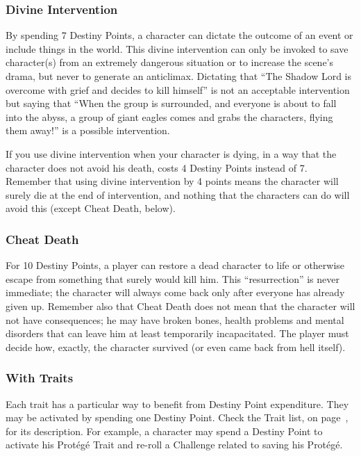 \begin{multicols}{2}
\subsubsection{Divine Intervention}
By spending 7 Destiny Points, a character can dictate the outcome of an event or include things in the world. This divine intervention can only be invoked to save character(s) from an extremely dangerous situation or to increase the scene’s drama, but never to generate an anticlimax. Dictating that ``The Shadow Lord is overcome with grief and decides to kill himself'' is not an acceptable intervention but saying that ``When the group is surrounded, and everyone is about to fall into the abyss, a group of giant eagles comes and grabs the characters, flying them away!'' is a possible intervention. %

If you use divine intervention when your character is dying, in a way that the character does not avoid his death, costs 4 Destiny Points instead of 7. Remember that using divine intervention by 4 points means the character will surely die at the end of intervention, and nothing that the characters can do will avoid this (except Cheat Death, below).

\subsubsection{Cheat Death}
For 10 Destiny Points, a player can restore a dead character to life or otherwise escape from something that surely would kill him. This ``resurrection'' is never immediate; the character will always come back only after everyone has already given up. Remember also that Cheat Death does not mean that the character will not have consequences; he may have broken bones, health problems and mental disorders that can leave him at least temporarily incapacitated. The player must decide how, exactly, the character survived (or even came back from hell itself).

\subsubsection{With Traits}
Each trait has a particular way to benefit from Destiny Point expenditure. They may be activated by spending one Destiny Point. Check the Trait list, on page~\pageref{subsec:traits}, for its description. For example, a character may spend a Destiny Point to activate his Prot\'eg\'e Trait and re-roll a Challenge related to saving his Prot\'eg\'e. 


\end{multicols}
